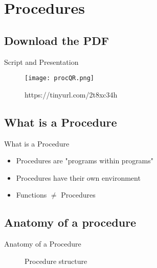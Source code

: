 \begin{frame}[t,plain]
    \titlepage
\end{frame}


\section{Procedures}
\subsection*{Download the PDF}
\begin{frame}{Script and Presentation}
    \begin{figure}
        \centering
        \texttt{[image: procQR.png]}
        \caption{https://tinyurl.com/2t8xc34h}
        \label{fig:qrcode}
    \end{figure}
\end{frame}


%
\subsection{What is a Procedure}
\begin{frame}{What is a Procedure}
    \begin{itemize}
        \item Procedures are "programs within programs"
        \item Procedures have their own environment
        \item Functions $\neq$ Procedures
    \end{itemize}
\end{frame}

\subsection{Anatomy of a procedure}
\begin{frame}{Anatomy of a Procedure}
    \begin{figure}
        
        \label{fig:anatomy}
        \caption{Procedure structure}
    \end{figure}
\end{frame}


